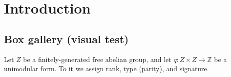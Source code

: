\chapter{Introduction}

\section{Box gallery (visual test)}

\begin{definition}
 Let $Z$ be a finitely-generated free abelian group, and let $q : Z \times Z \to \mathbb{Z}$ be a unimodular form. To it we assign rank, type (parity), and signature.
 \end{definition}










